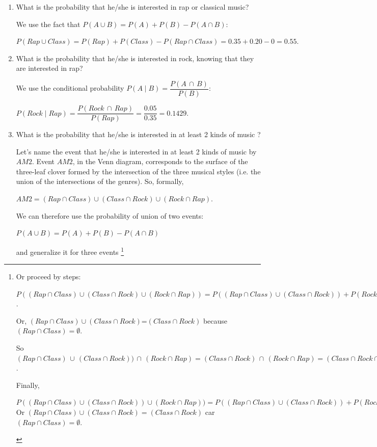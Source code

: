 \documentclass[12pt,thmsa]{article}
\begin{document}
 \begin{enumerate}%
 \item What is the probability that he/she is interested in rap or
classical music?

We use the fact that $P(A \cup B)=P(A)+P(B)-P(A \cap B)$:
\begin{center} $P(Rap \cup Class)=P(Rap)+P(Class)-P(Rap \cap Class)= 0.35+0.20-0=0.55.$ \end{center}


 \item What is the probability that he/she is interested in rock, knowing
that they are interested in rap?

We use the conditional probability $P(A \mid B)=\dfrac{P(A \,\cap\, B)}{P(B)}$:
\begin{center} $P(Rock \mid Rap)=\dfrac{P(Rock \,\cap\, Rap)}{P(Rap)}=\dfrac{0.05}{0.35}=0.1429.$ \end{center}

 \item What is the probability that he/she is interested in at least 2 kinds of
music ?

Let's name the event that he/she is interested in at least 2 kinds of music by $AM 2$.
Event $AM 2$, in the Venn diagram, corresponds to the surface of the three-leaf clover formed by the intersection of the three musical styles (i.e. the union of the intersections of the genres). So, formally,
\begin{center} $AM2 = (Rap \cap Class)\cup(Class \cap Rock)\cup(Rock \cap Rap).$ \end{center}
We can therefore use the probability of union of two events: \begin{center} $P(A \cup B)=P(A)+P(B)-P(A \cap B)$ \end{center} and generalize it for three events
\footnote{Or proceed by steps:
\begin{center} $P((Rap \cap Class)\cup(Class \cap Rock)\cup(Rock \cap Rap))=P((Rap \cap Class)\cup(Class \cap Rock))+P(Rock \cap Rap)- P(((Rap \cap Class)\cup(Class \cap Rock))\cap (Rock \cap Rap)$.
\end{center}

Or, $(Rap \cap Class)\cup(Class \cap Rock)$=$(Class \cap Rock)$ because $(Rap \cap Class)=\emptyset$.


So $(Rap \cap Class)\,\cup\,(Class \cap Rock))\,\cap\, (Rock \cap Rap) = (Class \cap Rock)\,\cap\, (Rock \cap Rap)=(Class \cap Rock \cap Rap)=\emptyset$.


Finally,
\begin{center} $P((Rap \cap Class)\cup(Class \cap Rock))\cup(Rock \cap Rap))= P((Rap \cap Class)\cup(Class \cap Rock))+P(Rock \cap Rap)$\\
Or $(Rap \cap Class)\cup(Class \cap Rock)=(Class \cap Rock)$ car $(Rap \cap Class)=\emptyset$.
\end{center}

}
\end{enumerate}
\end{document}
